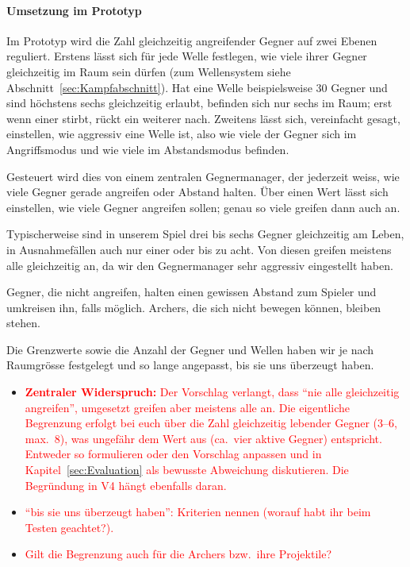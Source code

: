 \documentclass[../Main.tex]{subfiles}
\begin{document}
\paragraph{Umsetzung im Prototyp}
Im Prototyp wird die Zahl gleichzeitig angreifender Gegner auf zwei Ebenen reguliert. Erstens lässt sich für jede Welle festlegen, wie viele ihrer Gegner gleichzeitig im Raum sein dürfen (zum Wellensystem siehe Abschnitt~\ref{sec:Kampfabschnitt}). Hat eine Welle beispielsweise 30 Gegner und sind höchstens sechs gleichzeitig erlaubt, befinden sich nur sechs im Raum; erst wenn einer stirbt, rückt ein weiterer nach. Zweitens lässt sich, vereinfacht gesagt, einstellen, wie aggressiv eine Welle ist, also wie viele der Gegner sich im Angriffsmodus und wie viele im Abstandsmodus befinden.

Gesteuert wird dies von einem zentralen Gegnermanager, der jederzeit weiss, wie viele Gegner gerade angreifen oder Abstand halten. Über einen Wert lässt sich einstellen, wie viele Gegner angreifen sollen; genau so viele greifen dann auch an.

Typischerweise sind in unserem Spiel drei bis sechs Gegner gleichzeitig am Leben, in Ausnahmefällen auch nur einer oder bis zu acht. Von diesen greifen meistens alle gleichzeitig an, da wir den Gegnermanager sehr aggressiv eingestellt haben.

Gegner, die nicht angreifen, halten einen gewissen Abstand zum Spieler und umkreisen ihn, falls möglich. Archers, die sich nicht bewegen können, bleiben stehen.

Die Grenzwerte sowie die Anzahl der Gegner und Wellen haben wir je nach Raumgrösse festgelegt und so lange angepasst, bis sie uns überzeugt haben.

\begin{itemize}[leftmargin=1.5cm]
    \item \textcolor{red}{\textbf{Zentraler Widerspruch:} Der Vorschlag verlangt, dass \enquote{nie alle gleichzeitig angreifen}, umgesetzt greifen aber meistens alle an. Die eigentliche Begrenzung erfolgt bei euch über die Zahl gleichzeitig lebender Gegner (3--6, max.\ 8), was ungefähr dem Wert aus  (ca.\ vier aktive Gegner) entspricht. Entweder so formulieren oder den Vorschlag anpassen und in Kapitel~\ref{sec:Evaluation} als bewusste Abweichung diskutieren. Die Begründung in V4 hängt ebenfalls daran.}
    \item \textcolor{red}{\enquote{bis sie uns überzeugt haben}: Kriterien nennen (worauf habt ihr beim Testen geachtet?).}
    \item \textcolor{red}{Gilt die Begrenzung auch für die Archers bzw.\ ihre Projektile?}
\end{itemize}
\end{document}
